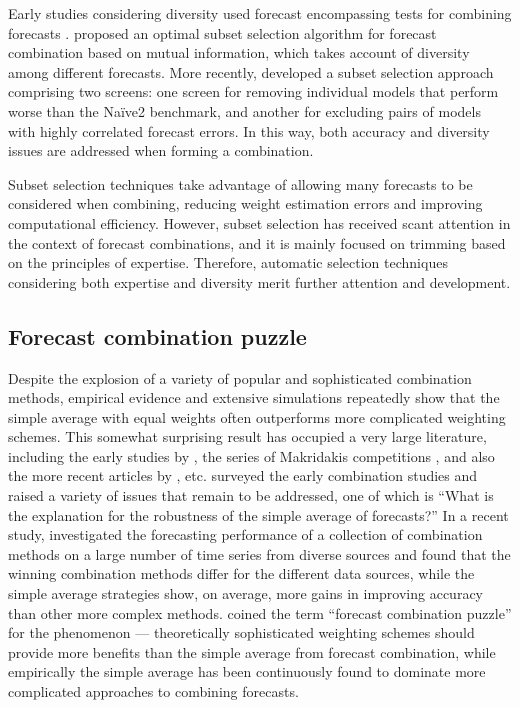 \documentclass[a4paper,11pt]{article}
\begin{document}
Early studies considering diversity used forecast encompassing tests for combining forecasts \citep[e.g.,][]{Kicsinbay2010-et,Costantini2010-hp}. \citet{Cang2014-tp} proposed an optimal subset selection algorithm for forecast combination based on mutual information, which takes account of diversity among different forecasts. More recently, \citet{Lichtendahl2020-ut} developed a subset selection approach comprising two screens: one screen for removing individual models that perform worse than the Na\"{i}ve2 benchmark, and another for excluding pairs of models with highly correlated forecast errors. In this way, both accuracy and diversity issues are addressed when forming a combination.

Subset selection techniques take advantage of allowing many forecasts to be considered when combining, reducing weight estimation errors and improving computational efficiency. However, subset selection has received scant attention in the context of forecast combinations, and it is mainly focused on trimming based on the principles of expertise. Therefore, automatic selection techniques considering both expertise and diversity merit further attention and development.

\subsection{Forecast combination puzzle}
\label{sec:puzzle}

Despite the explosion of a variety of popular and sophisticated combination methods, empirical evidence and extensive simulations repeatedly show that the simple average with equal weights often outperforms more complicated weighting schemes. This somewhat surprising result has occupied a very large literature, including the early studies by \citet{Stock1998-np,Stock2003-sp,Stock2004-rq}, the series of Makridakis competitions \citep{Makridakis1982-hb,Makridakis2000-he,Makridakis2020-hu}, and also the more recent articles by \citet{Blanc2016-sn,Blanc2020-pg}, etc. \citet{Clemen1989-fb} surveyed the early combination studies and raised a variety of issues that remain to be addressed, one of which is ``What is the explanation for the robustness of the simple average of forecasts?'' In a recent study, \citet{Gastinger2021-ey} investigated the forecasting performance of a collection of combination methods on a large number of time series from diverse sources and found that the winning combination methods differ for the different data sources, while the simple average strategies show, on average, more gains in improving accuracy than other more complex methods. \citet{Stock2004-rq} coined the term ``forecast combination puzzle'' for the phenomenon --- theoretically sophisticated weighting schemes should provide more benefits than the simple average from forecast combination, while empirically the simple average has been continuously found to dominate more complicated approaches to combining forecasts.
\end{document}
